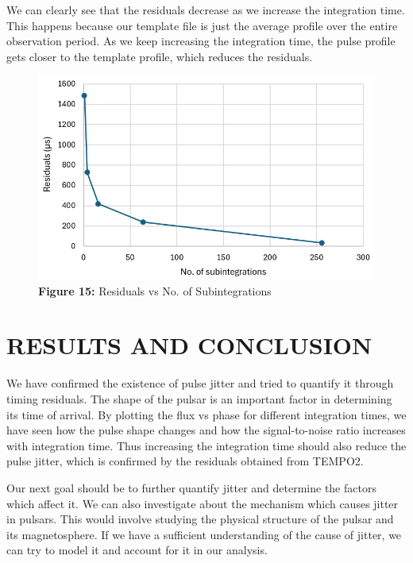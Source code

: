 \documentclass{article_saj}
\begin{document}
We can clearly see that the residuals decrease as we increase the integration time. This happens because our template file is just the average profile over the entire observation period. As we keep increasing the integration time, the pulse profile gets closer to the template profile, which reduces the residuals. 

\begin{figure}[h!]
  \begin{center}
    \includegraphics[width=0.85\columnwidth]{Plots/residuals.png}
    \caption*{\textbf{Figure 15:} Residuals vs No. of Subintegrations}
  \end{center}
\end{figure}

\vspace{2cm}
\section{RESULTS AND CONCLUSION}
We have confirmed the existence of pulse jitter and tried to quantify it through timing residuals. The shape of the pulsar is an important factor in determining its time of arrival. By plotting the flux vs phase for different integration times, we have seen how the pulse shape changes and how the signal-to-noise ratio increases with integration time. Thus increasing the integration time should also reduce the pulse jitter, which is confirmed by the residuals obtained from TEMPO2.

Our next goal should be to further quantify jitter and determine the factors which affect it. We can also investigate about the mechanism which causes jitter in pulsars. This would involve studying the physical structure of the pulsar and its magnetosphere. If we have a sufficient understanding of the cause of jitter, we can try to model it and account for it in our analysis. 
\clearpage

\nocite{burkesmith}
\nocite{lorimer}


\end{document}
